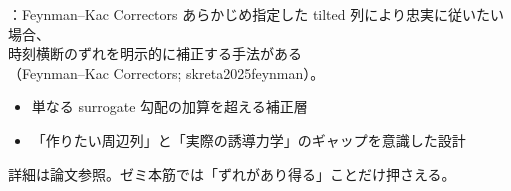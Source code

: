 \assuppl
\begin{frame}{\supplmark：Feynman--Kac Correctors}
    あらかじめ指定した tilted 列により忠実に従いたい場合、\\
    時刻横断のずれを明示的に補正する手法がある\\
    （Feynman--Kac Correctors; skreta2025feynman）。
    \begin{itemize}
        \item 単なる surrogate 勾配の加算を超える補正層
        \item 「作りたい周辺列」と「実際の誘導力学」のギャップを意識した設計
    \end{itemize}
    \vfill
    \footnotesize
    詳細は論文参照。ゼミ本筋では「ずれがあり得る」ことだけ押さえる。
\end{frame}
